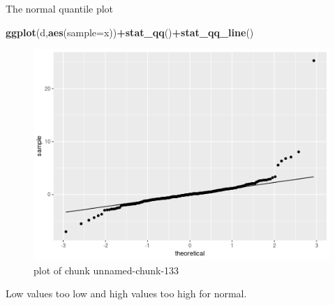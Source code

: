 \documentclass[ignorenonframetext,]{beamer}
\newenvironment{Shaded}{\begin{snugshade}}{\end{snugshade}}
\newcommand{\DataTypeTok}[1]{\textcolor[rgb]{0.13,0.29,0.53}{#1}}
\newcommand{\KeywordTok}[1]{\textcolor[rgb]{0.13,0.29,0.53}{\textbf{#1}}}
\newcommand{\NormalTok}[1]{#1}
\newcommand{\OperatorTok}[1]{\textcolor[rgb]{0.81,0.36,0.00}{\textbf{#1}}}
\begin{document}
\begin{frame}[fragile]{The normal quantile plot}
\protect\hypertarget{the-normal-quantile-plot-5}{}

\begin{Shaded}
\begin{Highlighting}[]
\KeywordTok{ggplot}\NormalTok{(d,}\KeywordTok{aes}\NormalTok{(}\DataTypeTok{sample=}\NormalTok{x))}\OperatorTok{+}\KeywordTok{stat_qq}\NormalTok{()}\OperatorTok{+}\KeywordTok{stat_qq_line}\NormalTok{()}
\end{Highlighting}
\end{Shaded}

\begin{figure}
\centering
\includegraphics{figure/unnamed-chunk-133-1.png}
\caption{plot of chunk unnamed-chunk-133}
\end{figure}

Low values too low and high values too high for normal.

\end{frame}
\end{document}
